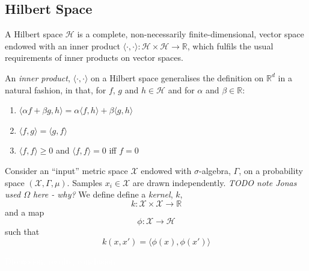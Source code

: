 \subsection{Hilbert Space}
\begin{defn}
A Hilbert space $\mathcal{H}$ is a complete, non-necessarily finite-dimensional, vector space endowed with an inner product $\langle\cdot,\cdot\rangle: \mathcal{H}\times\mathcal{H} \rightarrow\mathbb{R}$, which fulfils the usual requirements of inner products on vector spaces.
\end{defn}
\clearpage
\begin{defn}
An \emph{inner product}, $\langle\cdot,\cdot\rangle$ on a Hilbert space generalises the definition on $\mathbb{R}^d$ in a natural fashion, in that, for $f,\,g$ and $h \in \mathcal{H}$ and for $\alpha$ and $\beta \in \mathbb{R}$:
\begin{enumerate}
\item $\langle\alpha f + \beta g, h\rangle = \alpha\langle f, h\rangle + \beta\langle g, h\rangle$
\item $\langle f, g\rangle = \langle g, f \rangle$
\item $\langle f, f \rangle \ge 0$ and $\langle f, f\rangle = 0$ iff $f =0$
\end{enumerate}
\end{defn}

Consider an ``input'' metric space $\mathcal{X}$ endowed with $\sigma$-algebra, $\Gamma$,
on a probability space $(\mathcal{X}, \Gamma, \mu)$.
Samples $x_i \in \mathcal{X}$ are drawn independently.
\emph{TODO note Jonas used $\Omega$ here - why?}
\clearpage
We define define a \emph{kernel}, $k$,
\begin{equation}
k : \mathcal{X} \times \mathcal{X} \rightarrow \mathbb{R}
\end{equation}
and a map
\begin{equation}
\phi: \mathcal{X} \rightarrow \mathcal{H}
\end{equation}
such that 
\begin{equation}
k(x, x') = \langle \phi(x), \phi(x') \rangle
\end{equation}
\clearpage

\clearpage
\clearpage
\clearpage
\textcolor{white}{ %
Discussion, results, conclusion 
}


\ifoot{}%
\clearpage
%

 